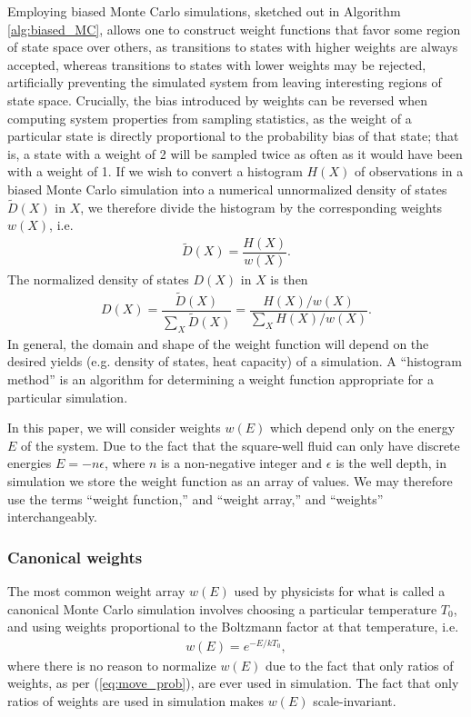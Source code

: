 \documentclass[11pt]{article}
\newcommand{\f}[2]{\dfrac{#1}{#2}} %
\newcommand{\p}[1]{\left(#1\right)} %
\begin{document}
Employing biased Monte Carlo simulations, sketched out in Algorithm
\ref{alg:biased_MC}, allows one to construct weight functions that
favor some region of state space over others, as transitions to states
with higher weights are always accepted, whereas transitions to states
with lower weights may be rejected, artificially preventing the
simulated system from leaving interesting regions of state
space. Crucially, the bias introduced by weights can be reversed when
computing system properties from sampling statistics, as the weight of
a particular state is directly proportional to the probability bias of
that state; that is, a state with a weight of 2 will be sampled twice
as often as it would have been with a weight of 1. If we wish to
convert a histogram $H\p{X}$ of observations in a biased Monte Carlo
simulation into a numerical unnormalized density of states $\tilde
D\p{X}$ in $X$, we therefore divide the histogram by the corresponding
weights $w\p{X}$, i.e.
\begin{align}
  \tilde D\p{X}=\f{H\p{X}}{w\p{X}}.
  \label{eq:dos}
\end{align}
The normalized density of states $D\p{X}$ in $X$ is then
\begin{align}
  D\p{X}=\f{\tilde D\p{X}}{\sum_X\tilde D\p{X}}
  =\f{H\p{X}/w\p{X}}{\sum_XH\p{X}/w\p{X}}.
  \label{eq:dos_norm}
\end{align}
In general, the domain and shape of the weight function will depend on
the desired yields (e.g.  density of states, heat capacity) of a
simulation. A ``histogram method'' is an algorithm for determining a
weight function appropriate for a particular simulation.

In this paper, we will consider weights $w\p{E}$ which depend only on
the energy $E$ of the system. Due to the fact that the square-well
fluid can only have discrete energies $E=-n\epsilon$, where $n$ is a
non-negative integer and $\epsilon$ is the well depth, in simulation
we store the weight function as an array of values. We may therefore
use the terms ``weight function,'' and ``weight array,'' and
``weights'' interchangeably.

\subsubsection{Canonical weights}
\label{sec:canonical_weights}

The most common weight array $w\p{E}$ used by physicists for what is
called a canonical Monte Carlo simulation involves choosing a
particular temperature $T_0$, and using weights proportional to the
Boltzmann factor at that temperature, i.e.
\begin{align}
  w\p{E}=e^{-E/kT_0},
\end{align}
where there is no reason to normalize $w\p{E}$ due to the fact that
only ratios of weights, as per (\ref{eq:move_prob}), are ever used in
simulation. The fact that only ratios of weights are used in
simulation makes $w\p{E}$ scale-invariant.
\end{document}
